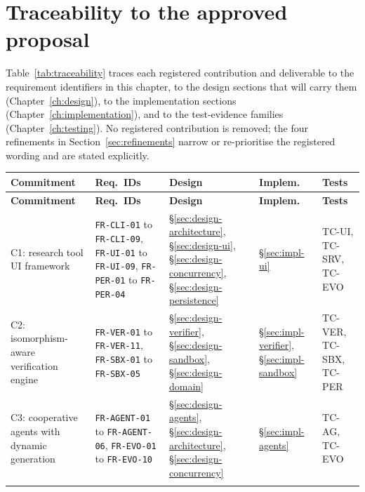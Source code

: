 \section{Traceability to the approved proposal}
\label{sec:traceability}

Table~\ref{tab:traceability} traces each registered contribution and deliverable
to the requirement identifiers in this chapter, to the design sections that will
carry them (Chapter~\ref{ch:design}), to the implementation sections
(Chapter~\ref{ch:implementation}), and to the test-evidence families
(Chapter~\ref{ch:testing}). No registered contribution is removed; the four
refinements in Section~\ref{sec:refinements} narrow or re-prioritise the
registered wording and are stated explicitly.

\begin{center}
\footnotesize
\setlength{\tabcolsep}{4pt}
\begin{longtable}{@{}>{\raggedright\arraybackslash}p{}>{\raggedright\arraybackslash}p{}>{\raggedright\arraybackslash}p{}>{\raggedright\arraybackslash}p{}>{\raggedright\arraybackslash}p{}@{}}
\toprule
\textbf{Commitment} & \textbf{Req.\ IDs} & \textbf{Design} & \textbf{Implem.} & \textbf{Tests} \\
\midrule
\endfirsthead
\toprule
\textbf{Commitment} & \textbf{Req.\ IDs} & \textbf{Design} & \textbf{Implem.} & \textbf{Tests} \\
\midrule
\endhead
\bottomrule
\endfoot

C1: research tool UI framework & \texttt{FR-CLI-01} to \texttt{FR-CLI-09},
\texttt{FR-UI-01} to \texttt{FR-UI-09}, \texttt{FR-PER-01} to \texttt{FR-PER-04} &
\S\ref{sec:design-architecture}, \S\ref{sec:design-ui},
\S\ref{sec:design-concurrency}, \S\ref{sec:design-persistence} &
\S\ref{sec:impl-ui} & TC-UI, TC-SRV, TC-EVO \\
\addlinespace[2pt]

C2: isomorphism-aware verification engine & \texttt{FR-VER-01} to
\texttt{FR-VER-11}, \texttt{FR-SBX-01} to \texttt{FR-SBX-05} &
\S\ref{sec:design-verifier}, \S\ref{sec:design-sandbox},
\S\ref{sec:design-domain} & \S\ref{sec:impl-verifier},
\S\ref{sec:impl-sandbox} & TC-VER, TC-SBX, TC-PER \\
\addlinespace[2pt]

C3: cooperative agents with dynamic generation & \texttt{FR-AGENT-01} to
\texttt{FR-AGENT-06}, \texttt{FR-EVO-01} to \texttt{FR-EVO-10} &
\S\ref{sec:design-agents}, \S\ref{sec:design-architecture},
\S\ref{sec:design-concurrency} & \S\ref{sec:impl-agents} &
TC-AG, TC-EVO \\
\addlinespace[2pt]


\end{longtable}
\end{center}
